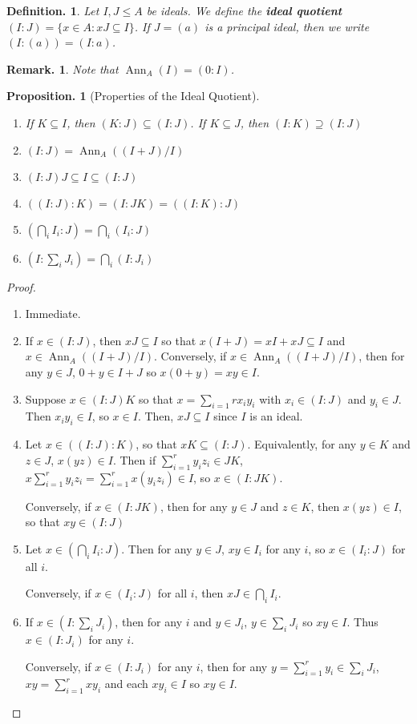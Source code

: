 \documentclass[11pt, a4paper]{memoir}
\theoremstyle{change}
\newtheorem{proposition}[theorem]{Proposition.}
\theoremstyle{plain}
\theoremstyle{nonumberplain}
\newtheorem{definition}{Definition.}
\newtheorem{remark}{Remark.}
\newtheorem{proof}{Proof}
\DeclareMathOperator{\Ann}{Ann}
\numberwithin{equation}{section}
\begin{document}
\begin{definition}
    Let $I,J\leq A$ be ideals.
    We define the \textbf{ideal quotient} $(I:J)=\{x\in A:xJ\subseteq I\}$.
    If $J=(a)$ is a principal ideal, then we write $(I:(a))=(I:a)$.
\end{definition}
\begin{remark}
    Note that $\Ann_A(I)=(0:I)$.
\end{remark}
\begin{proposition}[Properties of the Ideal Quotient]
    \begin{enumerate}[nl,r]
        \item If $K\subseteq I$, then $(K:J)\subseteq(I:J)$.
            If $K\subseteq J$, then $(I:K)\supseteq(I:J)$
        \item $(I:J)=\Ann_A((I+J)/I)$
        \item $(I:J)J\subseteq I\subseteq (I:J)$
        \item $((I:J):K)=(I:JK)=((I:K):J)$
        \item $\left(\bigcap_i I_i:J\right)=\bigcap_i(I_i:J)$
        \item $\left(I:\sum_i J_i\right)=\bigcap_i(I:J_i)$
    \end{enumerate}
\end{proposition}
\begin{proof}
    \begin{enumerate}[nl,r]
        \item Immediate.
        \item If $x\in(I:J)$, then $xJ\subseteq I$ so that $x(I+J)=xI+xJ\subseteq I$ and $x\in\Ann_A((I+J)/I)$.
            Conversely, if $x\in\Ann_A((I+J)/I)$, then for any $y\in J$, $0+y\in I+J$ so $x(0+y)=xy\in I$.
        \item Suppose $x\in (I:J)K$ so that $x=\sum_{i=1}r x_iy_i$ with $x_i\in(I:J)$ and $y_i\in J$.
            Then $x_iy_i\in I$, so $x\in I$.
            Then, $xJ\subseteq I$ since $I$ is an ideal.
        \item Let $x\in((I:J):K)$, so that $xK\subseteq (I:J)$.
            Equivalently, for any $y\in K$ and $z\in J$, $x(yz)\in I$.
            Then if $\sum_{i=1}^r y_iz_i\in JK$, $x\sum_{i=1}^r y_iz_i=\sum_{i=1}^r x(y_iz_i)\in I$, so $x\in (I:JK)$.

            Conversely, if $x\in (I:JK)$, then for any $y\in J$ and $z\in K$, then $x(yz)\in I$, so that $xy\in (I:J)$
        \item Let $x\in\left(\bigcap_i I_i:J\right)$.
            Then for any $y\in J$, $xy\in I_i$ for any $i$, so $x\in (I_i:J)$ for all $i$.

            Conversely, if $x\in (I_i:J)$ for all $i$, then $xJ\in\bigcap_i I_i$.
        \item If $x\in\left(I:\sum_i J_i\right)$, then for any $i$ and $y\in J_i$, $y\in \sum_i J_i$ so $xy\in I$.
            Thus $x\in (I:J_i)$ for any $i$.

            Conversely, if $x\in (I:J_i)$ for any $i$, then for any $y=\sum_{i=1}^r y_i\in\sum_i J_i$, $xy=\sum_{i=1}^r xy_i$ and each $xy_i\in I$ so $xy\in I$.
    \end{enumerate}
\end{proof}
\end{document}
